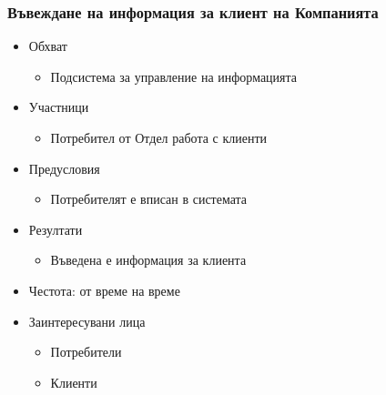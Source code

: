 \begin{frame}
  \frametitle{Въвеждане на информация за клиент на Компанията}

  \begin{itemize}

    \item{} 	Обхват
      \begin{itemize}

	\item{}Подсистема за управление на информацията
      \end{itemize}


    \item{} 	Участници
      \begin{itemize}

	\item{}Потребител от Отдел работа с клиенти
      \end{itemize}


    \item{} 	Предусловия
      \begin{itemize}

	\item{}Потребителят е вписан в системата
      \end{itemize}


    \item{} 	Резултати
      \begin{itemize}

	\item{}Въведена е информация за клиента
      \end{itemize}


    \item{} 	Честота: от време на време


    \item{} 	Заинтересувани лица
      \begin{itemize}

	\item{}Потребители

	\item{}Клиенти
      \end{itemize}

  \end{itemize}
\end{frame}
